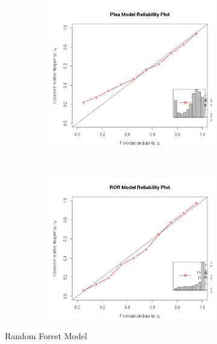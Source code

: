 \begin{figure}[h]
    \begin{subfigure}[p!]{\textwidth}
                \caption{Quality of Life Cases}
                \begin{subfigure}[p!]{0.49\textwidth}

                  \includegraphics[width=\textwidth]{figures/appc.png}
                  \label{fig:AppC}
                \end{subfigure}
                ~
                \begin{subfigure}[p!]{0.49\textwidth}

                  \includegraphics[width=\textwidth]{figures/appd.png}
                  \label{fig:AppD}
                \end{subfigure}
      \end{subfigure}
      \caption{Random Forest Model}
\end{figure}
\newpage

